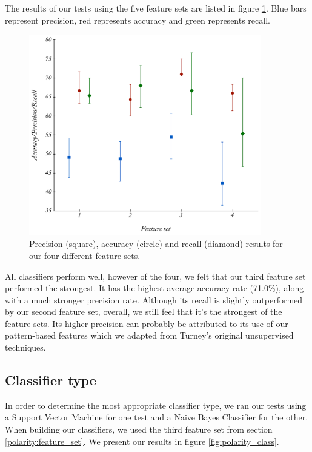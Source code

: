The results of our tests using the five feature sets are listed in figure \ref{fig:polarity_multi}. Blue bars represent precision, red represents accuracy and green represents recall.

\begin{figure}
	\caption{Precision (square), accuracy (circle) and recall (diamond) results for our four different feature sets.}
	\label{fig:polarity_multi}
	\centering
		\includegraphics[width=0.9\textwidth]{graphs/polarity_multi.pdf}
\end{figure}

All classifiers perform well, however of the four, we felt that our third feature set performed the strongest. It has the highest average accuracy rate (71.0\%), along with a much stronger precision rate. Although its recall is slightly outperformed by our second feature set, overall, we still feel that it's the strongest of the feature sets. Its higher precision can probably be attributed to its use of our pattern-based features which we adapted from Turney's \cite{Turney:2002vv} original unsupervised techniques.

\subsection{Classifier type}

In order to determine the most appropriate classifier type, we ran our tests using a Support Vector Machine for one test and a Naive Bayes Classifier for the other. When building our classifiers, we used the third feature set from section \ref{polarity:feature_set}. We present our results in figure \ref{fig:polarity_class}.

